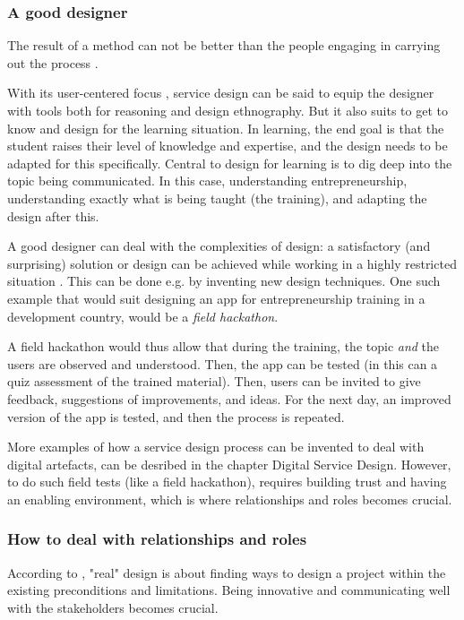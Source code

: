 \subsubsection{A good designer}

The result of a method can not be better than the people engaging in carrying out the process \citep{lowgren}.

With its user-centered focus \citep{stickdorn}, service design can be said to equip the designer with tools both for reasoning and design ethnography. But it also suits to get to know and design for the learning situation. In learning, the end goal is that the student raises their level of knowledge and expertise, and the design needs to be adapted for this specifically. Central to design for learning is to dig deep into the topic being communicated. In this case, understanding entrepreneurship, understanding exactly what is being taught (the training), and adapting the design after this.

A good designer can deal with the complexities of design: a satisfactory (and surprising) solution or design can be achieved while working in a highly restricted situation \citep{lowgren}. This can be done e.g. by inventing new design techniques. One such example that would suit designing an app for entrepreneurship training in a development country, would be a \textit{field hackathon}.

A field hackathon would thus allow that during the training, the topic \textit{and} the users are observed and understood. Then, the app can be tested (in this can a quiz assessment of the trained material). Then, users can be invited to give feedback, suggestions of improvements, and  ideas. For the next day, an improved version of the app is tested, and then the process is repeated.

More examples of how a service design process can be invented to deal with digital artefacts, can be desribed in the chapter Digital Service Design. However, to do such field tests (like a field hackathon), requires building trust and having an enabling environment, which is where relationships and roles becomes crucial.

\subsubsection{How to deal with relationships and roles}
According to \cite{lowgren}, "real" design is about finding ways to design a project within the existing preconditions and limitations. Being innovative and communicating well with the stakeholders becomes crucial.

